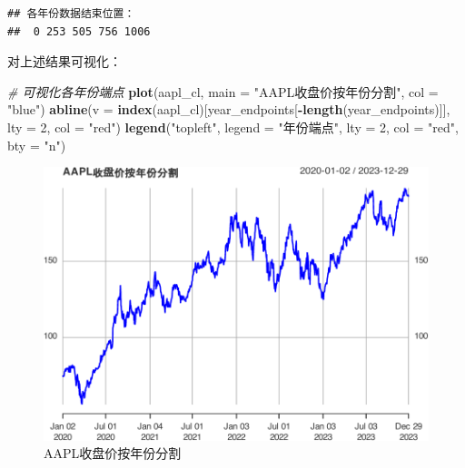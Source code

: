 \documentclass[]{ctexbook}
\newenvironment{Shaded}{\begin{snugshade}}{\end{snugshade}}
\newcommand{\AttributeTok}[1]{\textcolor[rgb]{0.13,0.29,0.53}{#1}}
\newcommand{\CommentTok}[1]{\textcolor[rgb]{0.56,0.35,0.01}{\textit{#1}}}
\newcommand{\DecValTok}[1]{\textcolor[rgb]{0.00,0.00,0.81}{#1}}
\newcommand{\FunctionTok}[1]{\textcolor[rgb]{0.13,0.29,0.53}{\textbf{#1}}}
\newcommand{\NormalTok}[1]{#1}
\newcommand{\SpecialCharTok}[1]{\textcolor[rgb]{0.81,0.36,0.00}{\textbf{#1}}}
\newcommand{\StringTok}[1]{\textcolor[rgb]{0.31,0.60,0.02}{#1}}
\begin{document}
\begin{verbatim}
## 各年份数据结束位置：
##  0 253 505 756 1006
\end{verbatim}

对上述结果可视化：

\begin{Shaded}
\begin{Highlighting}[]
\CommentTok{\# 可视化各年份端点}
\FunctionTok{plot}\NormalTok{(aapl\_cl, }\AttributeTok{main =} \StringTok{"AAPL收盘价按年份分割"}\NormalTok{, }\AttributeTok{col =} \StringTok{"blue"}\NormalTok{)}
\FunctionTok{abline}\NormalTok{(}\AttributeTok{v =} \FunctionTok{index}\NormalTok{(aapl\_cl)[year\_endpoints[}\SpecialCharTok{{-}}\FunctionTok{length}\NormalTok{(year\_endpoints)]], }
       \AttributeTok{lty =} \DecValTok{2}\NormalTok{, }\AttributeTok{col =} \StringTok{"red"}\NormalTok{)}
\FunctionTok{legend}\NormalTok{(}\StringTok{"topleft"}\NormalTok{, }\AttributeTok{legend =} \StringTok{"年份端点"}\NormalTok{, }\AttributeTok{lty =} \DecValTok{2}\NormalTok{, }\AttributeTok{col =} \StringTok{"red"}\NormalTok{, }\AttributeTok{bty =} \StringTok{"n"}\NormalTok{)}
\end{Highlighting}
\end{Shaded}

\begin{figure}
\includegraphics[width=0.9\linewidth]{QuantmodHandbook_files/figure-latex/visendpoints-1} \caption{AAPL收盘价按年份分割}\label{fig:visendpoints}
\end{figure}
\end{document}
